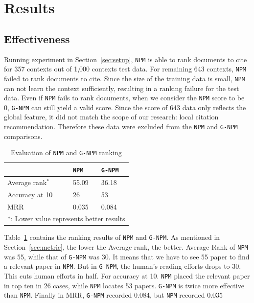 \documentclass{llncs}
\newcommand{\name}{\texttt{G-NPM}\xspace}
\newcommand{\npm}{\texttt{NPM}\xspace}
\begin{document}
\section{Results}

\subsection{Effectiveness}
Running experiment in Section~\ref{sec:setup}, \npm is able to rank documents to cite for 357 contexts out of 1,000 contexts test data. For remaining 643 contexts, \npm failed to rank documents to cite. Since the size of the training data is small, \npm can not learn the context sufficiently, resulting in a ranking failure for the test data. Even if \npm fails to rank documents, when we consider the \npm score to be 0, \name can still yield a valid score. Since the score of 643 data only reflects the global feature, it did not match the scope of our research: local citation recommendation. Therefore these data were excluded from the \npm and \name comparisons.

\begin{table}[ht]
\centering
\begin{tabular}{l || p{} | p{}}
\toprule
& \npm & \name \\
\midrule
Average rank$^\ast$ & 55.09 & 36.18 \\
Accuracy at 10 & 26 & 53 \\
MRR & 0.035 & 0.084\\
\midrule
\multicolumn{3}{l}{$\ast$: Lower value represents better results} \\
\bottomrule
\end{tabular}
\caption{Evaluation of \npm and \name ranking}\label{table:rq1}
\vspace{-2em}
\end{table}

Table~\ref{table:rq1} contains the ranking results of \npm and \name. As mentioned in Section~\ref{sec:metric}, the lower the Average rank, the better. Average Rank of \npm was 55, while  that of \name was 30. It means that we have to see 55 paper to find a relevant paper in \npm. But in \name, the human's reading efforts drops to 30. This cuts human efforts in half. For accuracy at 10. \npm placed the relevant paper in top ten in 26 cases, while \npm locates 53 papers. \name is twice more effective than \npm. Finally in MRR, \name recorded 0.084, but \npm recorded 0.035
\end{document}
